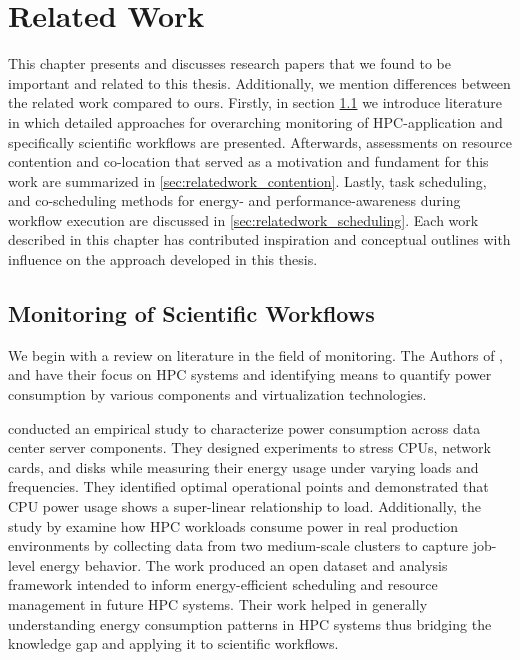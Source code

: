 \section{Related Work}
\label{cha:relatedwork}
This chapter presents and discusses research papers that we found to be important and related to this thesis. Additionally, we mention differences between the related work compared to ours.
Firstly, in section \ref{sec:relatedwork_monitoring} we introduce literature in which detailed approaches for overarching monitoring of HPC-application and specifically scientific workflows are presented.
Afterwards, assessments on resource contention and co-location that served as a motivation and fundament for this work are summarized in \ref{sec:relatedwork_contention}. Lastly, task scheduling, and co-scheduling methods for energy- and performance-awareness during workflow execution are discussed in \ref{sec:relatedwork_scheduling}.
Each work described in this chapter has contributed inspiration and conceptual outlines with influence on the approach developed in this thesis.

\subsection{Monitoring of Scientific Workflows}
\label{sec:relatedwork_monitoring}

We begin with a review on literature in the field of monitoring. The Authors of \cite{7274318}, \cite{9139801} and \cite{9653557}
have their focus on HPC systems and identifying means to quantify power consumption by various components and virtualization technologies.

\cite{7274318} conducted an empirical study to characterize power consumption across data center server components. They designed experiments to stress CPUs, network cards, and disks while measuring their energy usage under varying loads and frequencies. They identified optimal operational points and demonstrated that CPU power usage shows a super-linear relationship to load.
Additionally, the study by \cite{9139801} examine how HPC workloads consume power in real production environments by collecting data from two medium-scale clusters to capture job-level energy behavior. The work produced an open dataset and analysis framework intended to inform energy-efficient scheduling and resource management in future HPC systems. Their work helped in generally understanding energy consumption patterns in HPC systems thus bridging the knowledge gap and applying it to scientific workflows.

